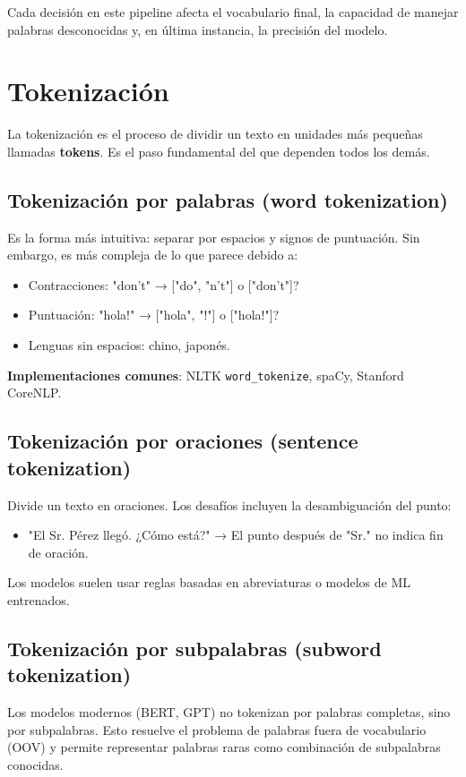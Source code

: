 \documentclass[12pt,a4paper,openany,oneside]{book}
\begin{document}
Cada decisión en este pipeline afecta el vocabulario final, la capacidad de manejar palabras desconocidas y, en última instancia, la precisión del modelo.

\section{Tokenización}

La tokenización es el proceso de dividir un texto en unidades más pequeñas llamadas \textbf{tokens}. Es el paso fundamental del que dependen todos los demás.

\subsection{Tokenización por palabras (word tokenization)}
Es la forma más intuitiva: separar por espacios y signos de puntuación. Sin embargo, es más compleja de lo que parece debido a:
\begin{itemize}
    \item Contracciones: "don't" → ["do", "n't"] o ["don't"]?
    \item Puntuación: "hola!" → ["hola", "!"] o ["hola!"]?
    \item Lenguas sin espacios: chino, japonés.
\end{itemize}

\textbf{Implementaciones comunes}: NLTK \texttt{word\_tokenize}, spaCy, Stanford CoreNLP.

\subsection{Tokenización por oraciones (sentence tokenization)}
Divide un texto en oraciones. Los desafíos incluyen la desambiguación del punto:
\begin{itemize}
    \item "El Sr. Pérez llegó. ¿Cómo está?" → El punto después de "Sr." no indica fin de oración.
\end{itemize}
Los modelos suelen usar reglas basadas en abreviaturas o modelos de ML entrenados.

\subsection{Tokenización por subpalabras (subword tokenization)}
Los modelos modernos (BERT, GPT) no tokenizan por palabras completas, sino por subpalabras. Esto resuelve el problema de palabras fuera de vocabulario (OOV) y permite representar palabras raras como combinación de subpalabras conocidas.
\end{document}
